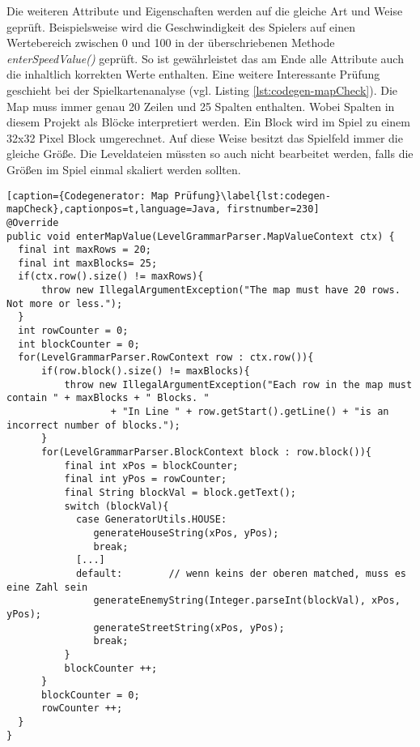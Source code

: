 Die weiteren Attribute und Eigenschaften werden auf die gleiche Art und Weise geprüft. Beispielsweise wird die Geschwindigkeit des Spielers auf einen Wertebereich zwischen 0 und 100 in der überschriebenen Methode \textit{enterSpeedValue()} geprüft. So ist gewährleistet das am Ende alle Attribute auch die inhaltlich korrekten Werte enthalten. \newline
Eine weitere Interessante Prüfung geschieht bei der Spielkartenanalyse (vgl. Listing \ref{lst:codegen-mapCheck}). Die Map muss immer genau 20 Zeilen und 25 Spalten enthalten. Wobei Spalten in diesem Projekt als Blöcke interpretiert werden. Ein Block wird im Spiel zu einem 32x32 Pixel Block umgerechnet. Auf diese Weise besitzt das Spielfeld immer die gleiche Größe. Die Leveldateien müssten so auch nicht bearbeitet werden, falls die Größen im Spiel einmal skaliert werden sollten.\newline
\begin{minipage}{\linewidth}
\begin{lstlisting}[caption={Codegenerator: Map Prüfung}\label{lst:codegen-mapCheck},captionpos=t,language=Java, firstnumber=230]
@Override
public void enterMapValue(LevelGrammarParser.MapValueContext ctx) {
  final int maxRows = 20;
  final int maxBlocks= 25;
  if(ctx.row().size() != maxRows){
      throw new IllegalArgumentException("The map must have 20 rows. Not more or less.");
  }
  int rowCounter = 0;
  int blockCounter = 0;
  for(LevelGrammarParser.RowContext row : ctx.row()){
      if(row.block().size() != maxBlocks){
          throw new IllegalArgumentException("Each row in the map must contain " + maxBlocks + " Blocks. "
                  + "In Line " + row.getStart().getLine() + "is an incorrect number of blocks.");
      }
      for(LevelGrammarParser.BlockContext block : row.block()){
          final int xPos = blockCounter;
          final int yPos = rowCounter;
          final String blockVal = block.getText();
          switch (blockVal){
            case GeneratorUtils.HOUSE:
               generateHouseString(xPos, yPos);
               break;
            [...]
            default:        // wenn keins der oberen matched, muss es eine Zahl sein
               generateEnemyString(Integer.parseInt(blockVal), xPos, yPos);
               generateStreetString(xPos, yPos);
               break;
          }
          blockCounter ++;
      }
      blockCounter = 0;
      rowCounter ++;
  }
}
\end{lstlisting}
\end{minipage}


